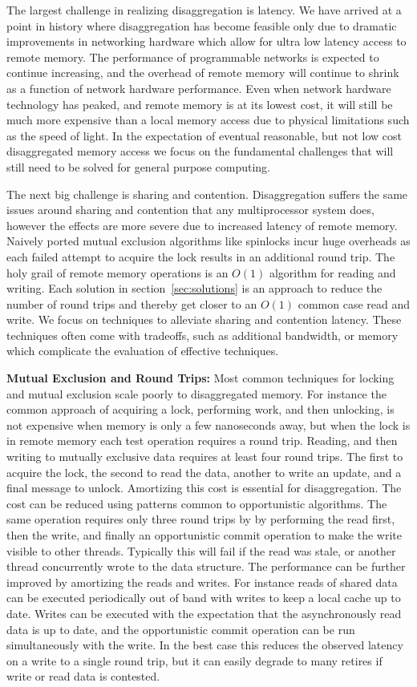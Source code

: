 The largest challenge in realizing disaggregation is latency. We have arrived at
a point in history where disaggregation has become feasible only due to dramatic
improvements in networking hardware which allow for ultra low latency access to
remote memory. The performance of programmable networks is expected to continue
increasing, and the overhead of remote memory will continue to shrink as a
function of network hardware performance.  Even when network hardware technology
has peaked, and remote memory is at its lowest cost, it will still be much more
expensive than a local memory access due to physical limitations such as the
speed of light. In the expectation of eventual reasonable, but not low cost
disaggregated memory access we focus on the fundamental challenges that will
still need to be solved for general purpose computing. 

The next big challenge is sharing and contention. Disaggregation suffers the
same issues around sharing and contention that any multiprocessor system does,
however the effects are more severe due to increased latency of remote memory.
Naively ported mutual exclusion algorithms like spinlocks incur huge overheads
as each failed attempt to acquire the lock results in an additional round trip.
The holy grail of remote memory operations is an $O(1)$ algorithm for reading
and writing. Each solution in section~\ref{sec:solutions} is an approach to
reduce the number of round trips and thereby get closer to an $O(1)$ common case
read and write.  We focus on techniques to alleviate sharing and contention
latency. These techniques often come with tradeoffs, such as additional
bandwidth, or memory which complicate the evaluation of effective techniques.

\textbf{Mutual Exclusion and Round Trips:} 
Most common techniques for locking and mutual exclusion scale poorly to
disaggregated memory. For instance the common approach of acquiring a lock,
performing work, and then unlocking, is not expensive when memory is only a few
nanoseconds away, but when the lock is in remote memory each test operation
requires a round trip.  Reading, and then writing to mutually exclusive data
requires at least four round trips. The first to acquire the lock, the second to
read the data, another to write an update, and a final message to unlock.
Amortizing this cost is essential for disaggregation. The cost can be reduced
using patterns common to opportunistic algorithms. The same operation requires
only three round trips by by performing the read first, then the write, and
finally an opportunistic commit operation to make the write visible to other
threads. Typically this will fail if the read was stale, or another thread
concurrently wrote to the data structure. The performance can be further
improved by amortizing the reads and writes. For instance reads of shared data
can be executed periodically out of band with writes to keep a local cache up to
date.  Writes can be executed with the expectation that the asynchronously read
data is up to date, and the opportunistic commit operation can be run
simultaneously with the write. In the best case this reduces the observed
latency on a write to a single round trip, but it can easily degrade to many
retires if write or read data is contested. 

